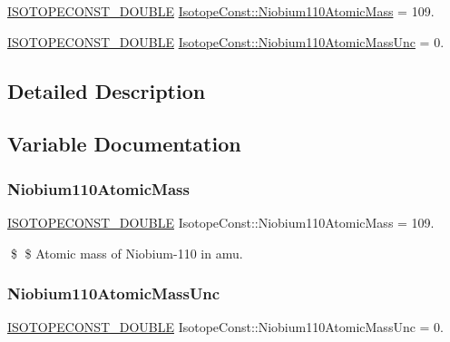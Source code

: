 \begin{DoxyCompactItemize}
\item 
\mbox{\hyperlink{group___isotope_const-_macros_ga8f45a7272ce02c0b4c65c44636ed719a}{I\+S\+O\+T\+O\+P\+E\+C\+O\+N\+S\+T\+\_\+\+D\+O\+U\+B\+LE}} \mbox{\hyperlink{group___isotope_const-_niobium-_nb110_gad4e2f992627c1c642708aa59cbb87e20}{Isotope\+Const\+::\+Niobium110\+Atomic\+Mass}} = 109.
\item 
\mbox{\hyperlink{group___isotope_const-_macros_ga8f45a7272ce02c0b4c65c44636ed719a}{I\+S\+O\+T\+O\+P\+E\+C\+O\+N\+S\+T\+\_\+\+D\+O\+U\+B\+LE}} \mbox{\hyperlink{group___isotope_const-_niobium-_nb110_gafaec4172cdc2ebbec9af4149249904cf}{Isotope\+Const\+::\+Niobium110\+Atomic\+Mass\+Unc}} = 0.
\end{DoxyCompactItemize}


\subsection{Detailed Description}


\subsection{Variable Documentation}
\mbox{\label{group___isotope_const-_niobium-_nb110_gad4e2f992627c1c642708aa59cbb87e20}} 
\subsubsection{\texorpdfstring{Niobium110\+Atomic\+Mass}{Niobium110AtomicMass}}
{\footnotesize\ttfamily \mbox{\hyperlink{group___isotope_const-_macros_ga8f45a7272ce02c0b4c65c44636ed719a}{I\+S\+O\+T\+O\+P\+E\+C\+O\+N\+S\+T\+\_\+\+D\+O\+U\+B\+LE}} Isotope\+Const\+::\+Niobium110\+Atomic\+Mass = 109.}

\$ \$ Atomic mass of Niobium-\/110 in amu. \mbox{\label{group___isotope_const-_niobium-_nb110_gafaec4172cdc2ebbec9af4149249904cf}} 
\subsubsection{\texorpdfstring{Niobium110\+Atomic\+Mass\+Unc}{Niobium110AtomicMassUnc}}
{\footnotesize\ttfamily \mbox{\hyperlink{group___isotope_const-_macros_ga8f45a7272ce02c0b4c65c44636ed719a}{I\+S\+O\+T\+O\+P\+E\+C\+O\+N\+S\+T\+\_\+\+D\+O\+U\+B\+LE}} Isotope\+Const\+::\+Niobium110\+Atomic\+Mass\+Unc = 0.}

